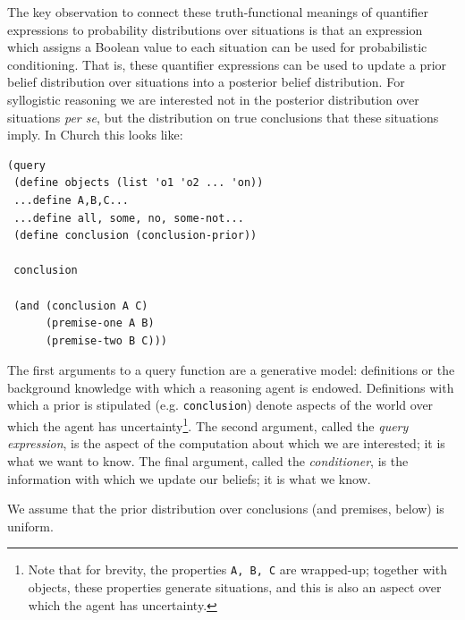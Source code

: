 \documentclass[10pt,letterpaper]{article}
\begin{document}
The key observation to connect these truth-functional meanings of quantifier expressions to probability distributions over situations is that an expression which assigns a Boolean value to each situation can be used for probabilistic conditioning. That is, these quantifier expressions can be used to update a prior belief distribution over situations into a posterior belief distribution. For syllogistic reasoning we are interested not in the posterior distribution over situations \emph{per se}, but the distribution on true conclusions that these situations imply. In Church this looks like:
\begin{lstlisting}
(query
 (define objects (list 'o1 'o2 ... 'on))
 ...define A,B,C...
 ...define all, some, no, some-not...
 (define conclusion (conclusion-prior))
 
 conclusion
 
 (and (conclusion A C) 
      (premise-one A B)
      (premise-two B C)))
\end{lstlisting}

The first arguments to a query function are a generative model: definitions or the background knowledge with which a reasoning agent is endowed. Definitions with which a prior is stipulated (e.g. \lstinline{conclusion}) denote aspects of the world over which the agent has uncertainty\footnote{Note that for brevity, the properties \lstinline{A, B, C} are wrapped-up; together with objects, these properties generate situations, and this is also an aspect over which the agent has uncertainty.}. The second argument, called the \emph{query expression}, is the aspect of the computation about which we are interested; it is what we want to know. The final argument, called the \emph{conditioner}, is the information with which we update our beliefs; it is what we know. 

We assume that the prior distribution over conclusions (and premises, below) is uniform.

%
%  
%  
\end{document}
